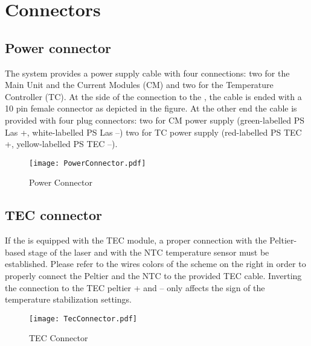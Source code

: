 \newpage
\section{Connectors}
\subsection{Power connector}

The \QubeModel  system provides a power supply cable with four connections: two for the Main Unit and the Current Modules (CM) and two for the Temperature Controller (TC).  At the side of the connection to the \QubeModel , the cable is ended with a 10 pin female connector as depicted in the figure. At the other end the cable is provided with four plug connectors:
two for CM power supply (green-labelled PS Las +, white-labelled PS Las –) 
two for TC power supply (red-labelled PS TEC +, yellow-labelled PS TEC –).


\begin{figure}[H]
\centering
\texttt{[image: PowerConnector.pdf]}
\caption{Power Connector}
\end{figure}

\subsection{TEC connector}

If the \QubeModel  is equipped with the TEC module, a proper connection with the Peltier-based stage of the laser and with the NTC temperature sensor must be established. Please refer to the wires colors of the scheme on the right in order to properly connect the Peltier and the NTC to the provided TEC cable.
Inverting the connection to the TEC peltier + and – only affects the sign of the temperature stabilization settings.

\begin{figure}[H]
\centering
\texttt{[image: TecConnector.pdf]}
\caption{TEC Connector}
\end{figure}
\newpage

